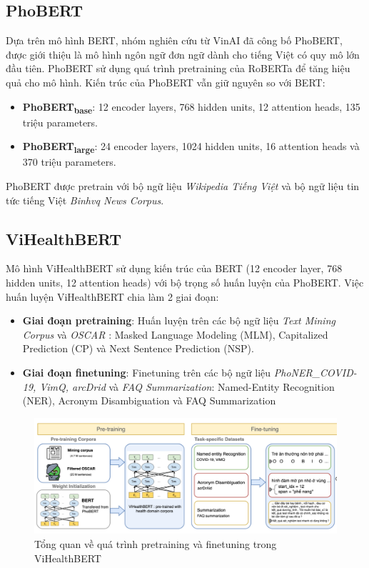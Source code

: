 \subsection{PhoBERT}
Dựa trên mô hình BERT, nhóm nghiên cứu từ VinAI đã công bố PhoBERT\cite{phobert}, được giới thiệu là mô hình ngôn ngữ đơn ngữ dành cho tiếng Việt có quy mô lớn đầu tiên. PhoBERT sử dụng quá trình pretraining của RoBERTa để tăng hiệu quả cho mô hình. Kiến trúc của PhoBERT vẫn giữ nguyên so với BERT:
\begin{itemize}
\item \textbf{PhoBERT\textsubscript{base}}: 12 encoder layers, 768 hidden units, 12 attention heads, 135 triệu parameters.
\item \textbf{PhoBERT\textsubscript{large}}: 24 encoder layers, 1024 hidden units, 16 attention heads và 370 triệu parameters.
\end{itemize}
PhoBERT được pretrain với bộ ngữ liệu \textit{Wikipedia Tiếng Việt} và bộ ngữ liệu tin tức tiếng Việt \textit{Binhvq News Corpus}.

\subsection{ViHealthBERT}
Mô hình ViHealthBERT sử dụng kiến trúc của BERT (12 encoder layer, 768 hidden units, 12 attention heads) với bộ trọng số huấn luyện của PhoBERT. Việc huấn luyện ViHealthBERT chia làm 2 giai đoạn:
\begin{itemize}
\item \textbf{Giai đoạn pretraining}: Huấn luyện trên các bộ ngữ liệu \textit{Text Mining Corpus} và \textit{OSCAR} : Masked Language Modeling (MLM), Capitalized Prediction (CP) và Next Sentence Prediction (NSP).
\item \textbf{Giai đoạn finetuning}: Finetuning trên các bộ ngữ liệu \textit{PhoNER\_COVID-19, VimQ, arcDrid} và \textit{FAQ Summarization}: Named-Entity Recognition (NER), Acronym Disambiguation và FAQ Summarization
\end{itemize}
\begin{figure}[H]
\begin{center}
\includegraphics[scale=.75]{img/ViHealthBERT.png}
\caption{Tổng quan về quá trình pretraining và finetuning trong ViHealthBERT\cite{minh-EtAl:2022:LREC}}
\end{center}
\end{figure}
